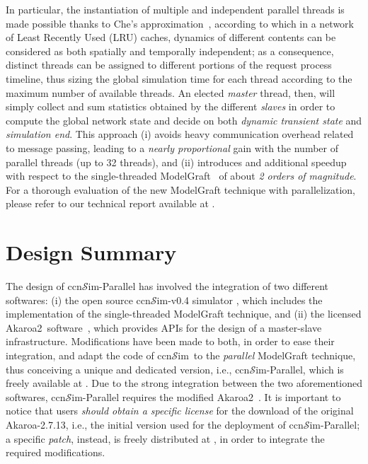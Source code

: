 \documentclass[10pt]{article}
\newcommand{\ccnsim}{ccn\ensuremath{\mathcal{S}}im} %
\newcommand{\akaroa}{Akaroa2\textcopyright\ }
\newcommand{\textapprox}{\raisebox{0.5ex}{\texttildelow}}
\begin{document}
In particular, the instantiation of multiple and independent parallel threads is made possible thanks to Che's approximation~\cite{wang02jsac_hierarchical}, according to which in a network of Least Recently Used (LRU) caches, dynamics of different contents can be considered as both spatially and temporally independent; as a consequence, 
distinct threads can be assigned to different portions of the request process timeline, thus sizing the global simulation time for each thread according to the maximum number of available threads.
An elected \emph{master} thread, then, will simply collect and sum statistics obtained by the different \emph{slaves} in order to compute the global network state and decide on both \emph{dynamic transient state} and \emph{simulation end}. 
This approach 
(i) avoids heavy communication overhead related to message passing, leading to a \emph{nearly proportional} gain with the number of parallel threads (up to \textapprox32 threads), and 
(ii) introduces and additional speedup with respect to the single-threaded ModelGraft~\cite{tortelli-comnet:17} of about \emph{2 orders of magnitude}. 
For a thorough evaluation of the new ModelGraft technique with parallelization, please refer to our technical report available at \cite{pMG_techRep}.     

\section*{Design Summary}
The design of \ccnsim-Parallel has involved the integration of two different softwares: 
(i) the open source \ccnsim-v0.4 simulator \cite{ccnSim}, which includes the implementation of the single-threaded ModelGraft technique, and 
(ii) the licensed \akaroa software~\cite{ewing:99,AkaroaPrj}, which provides APIs for the design of a master-slave infrastructure. 
Modifications have been made to both, in order to ease their integration, and adapt the code of \ccnsim\ to the \emph{parallel} ModelGraft technique, thus conceiving a unique and dedicated version, i.e., \ccnsim-Parallel, which is freely available at \cite{ccnSim}. 
Due to the strong integration between the two aforementioned softwares, \ccnsim-Parallel requires the modified \akaroa.
It is important to notice that users \emph{should obtain a specific license} for the download of the original Akaroa-2.7.13, i.e., the initial version used for the deployment of \ccnsim-Parallel; a specific \emph{patch}, instead, is freely distributed at \cite{ccnSim}, in order to integrate the required modifications.
\end{document}
